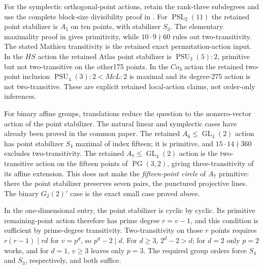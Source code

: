 \documentclass[11pt,a4paper]{article}
\begin{document}
For the symplectic orthogonal-point actions, retain the rank-three
subdegrees and use the complete block-size divisibility proof in
\cite[Proposition~\ref{U-orthogonalcircles}]{U}. For
$\operatorname{PSL}_2(11)$ the retained point stabilizer is $A_5$ on
ten points, with stabilizer $S_3$. The elementary maximality proof in
\cite[Proposition~\ref{U-nineplane}]{U} gives primitivity, while
$10\cdot9\nmid60$ rules out two-transitivity. The stated Mathieu
transitivity is the retained exact permutation-action input. In the
$HS$ action the retained Atlas point stabilizer is
$\operatorname{PSU}_3(5):2$, primitive but not two-transitive on the
other175 points. In the $Co_3$ action the retained two-point inclusion
$\operatorname{PSU}_4(3):2<McL:2$ is maximal and its degree-275
action is not two-transitive. These are explicit retained local-action
claims, not order-only inferences.

For binary affine groups, translations reduce the question to the
nonzero-vector action of the point stabilizer. The natural linear and
symplectic cases have already been proved in the common paper. The
retained $A_6\leq\operatorname{GL}_4(2)$ action has point stabilizer
$S_4$ maximal of index fifteen; it is primitive, and
$15\cdot14\nmid360$ excludes two-transitivity. The retained
$A_7\leq\operatorname{GL}_4(2)$ action is the two-transitive action
on the fifteen points of $\operatorname{PG}(3,2)$, giving
three-transitivity of its affine extension. This does not make the
\emph{fifteen-point circle} of $A_7$ primitive: there the point
stabilizer preserves seven pairs, the punctured projective lines.
The binary $G_2(2)'$ case is the exact small case proved above.

In the one-dimensional entry, the point stabilizer is cyclic by cyclic.
Its primitive remaining-point action therefore has prime degree
$r=v-1$, and this condition is sufficient by prime-degree transitivity.
Two-transitivity on those $r$ points requires
$r(r-1)\mid r d$ for $v=p^d$, so $p^d-2\mid d$.
For $d\geq3$, $2^d-2>d$; for $d=2$ only $p=2$ works, and for
$d=1$, $v\geq3$ leaves only $p=3$. The required group orders force
$S_4$ and $S_3$, respectively, and both suffice.
\end{document}
